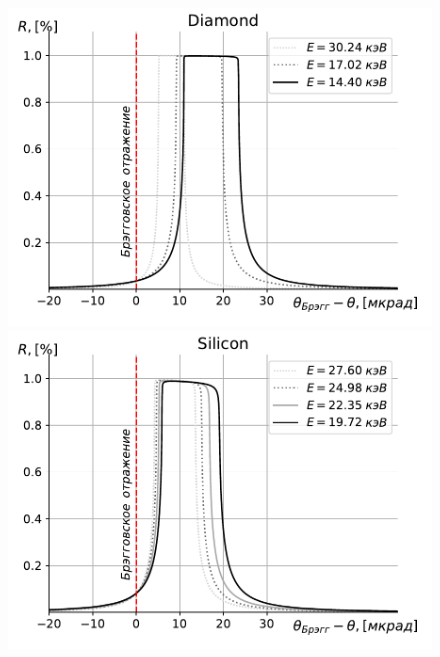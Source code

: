 \documentclass[14pt,a4paper]{extarticle}
\numberwithin{equation}{section}
\begin{document}
	\begin{figure}[h!]
		\centering  
		\begin{minipage}{0.49\textwidth}
			\centering
			\includegraphics[width=\textwidth]{pic/Diamond_bragg_R.pdf}
			\caption{}
			\label{fig:Diamond_bragg_R}
		\end{minipage}\hfill
		\begin{minipage}{0.49\textwidth}
			\centering
			\includegraphics[width=\textwidth]{pic/Silicon_bragg_R.pdf}
			\caption{}
			\label{fig:Silicon_bragg_R}
		\end{minipage}    
	\end{figure}
	 		
\end{document}
